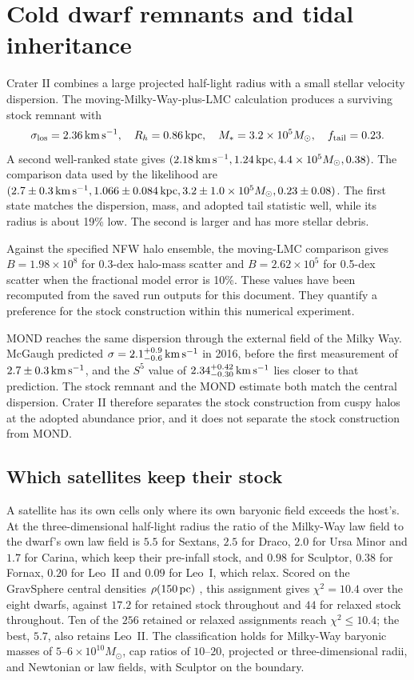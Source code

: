 \section{Cold dwarf remnants and tidal inheritance}
\label{sec:crater}

Crater II combines a large projected half-light radius with a small stellar
velocity dispersion. The moving-Milky-Way-plus-LMC calculation produces a
surviving stock remnant with
\begin{equation}
\sigma_{\rm los}=2.36\,\mathrm{km\,s^{-1}},\quad R_h=0.86\,\mathrm{kpc},\quad
M_*=3.2\times10^5M_\odot,\quad f_{\rm tail}=0.23.
\label{eq:craterbest}
\end{equation}
A second well-ranked state gives
$(2.18\,\mathrm{km\,s^{-1}},1.24\,\mathrm{kpc},4.4\times10^5M_\odot,0.38)$.
The comparison data used by the likelihood are
$(2.7\pm0.3\,\mathrm{km\,s^{-1}},1.066\pm0.084\,\mathrm{kpc},
3.2\pm1.0\times10^5M_\odot,0.23\pm0.08)$.
The first state matches the dispersion, mass, and adopted tail statistic
well, while its radius is about 19\% low. The second is larger and has
more stellar debris. 

Against the specified NFW halo ensemble, the moving-LMC comparison gives
$B=1.98\times10^8$ for 0.3-dex halo-mass scatter and
$B=2.62\times10^5$ for 0.5-dex scatter when the fractional model error is
10\%. These values have been recomputed from the saved run outputs for
this document. They quantify a preference for the stock construction
within this numerical experiment.

MOND reaches the same dispersion through the external field of the Milky
Way. McGaugh predicted $\sigma=2.1^{+0.9}_{-0.6}\,\mathrm{km\,s^{-1}}$ in 2016, before
the first measurement of $2.7\pm0.3\,\mathrm{km\,s^{-1}}$, and the $S^5$ value of
$2.34^{+0.42}_{-0.30}\,\mathrm{km\,s^{-1}}$ lies closer to that prediction. The stock
remnant and the MOND estimate both match the central dispersion. Crater II
therefore separates the stock construction from cuspy halos at the adopted
abundance prior, and it does not separate the stock construction from
MOND. \cite{mcgaugh16,ji}

\subsection{Which satellites keep their stock}

A satellite has its own cells only where its own baryonic field exceeds
the host's. At the three-dimensional half-light radius the ratio of the
Milky-Way law field to the dwarf's own law field is $5.5$ for Sextans,
$2.5$ for Draco, $2.0$ for Ursa Minor and $1.7$ for Carina, which keep
their pre-infall stock, and $0.98$ for Sculptor, $0.38$ for Fornax,
$0.20$ for Leo~II and $0.09$ for Leo~I, which relax. Scored on the
GravSphere central densities $\rho(150\,{\rm pc})$ \cite{read19}, this
assignment gives $\chi^2=10.4$ over the eight dwarfs, against $17.2$
for retained stock throughout and $44$ for relaxed stock throughout.
Ten of the $256$ retained or relaxed assignments reach
$\chi^2\le10.4$; the best, $5.7$, also retains Leo~II. The
classification holds for Milky-Way baryonic masses of
$5$--$6\times10^{10}M_\odot$, cap ratios of $10$--$20$, projected or
three-dimensional radii, and Newtonian or law fields, with Sculptor on
the boundary. 

